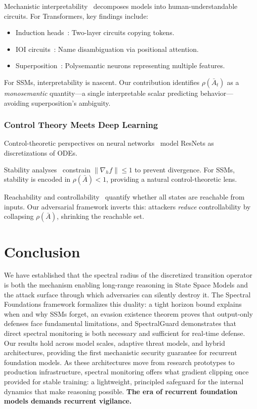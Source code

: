 \documentclass[10pt,twocolumn]{article}
\begin{document}
Mechanistic interpretability~\cite{elhage2021mathematical,olah2020zoom} decomposes models into human-understandable circuits. For Transformers, key findings include:
\begin{itemize}
\item Induction heads~\cite{olsson2022context}: Two-layer circuits copying tokens.
\item IOI circuits~\cite{wang2022interpretability}: Name disambiguation via positional attention.
\item Superposition~\cite{elhage2022toy}: Polysemantic neurons representing multiple features.
\end{itemize}

For SSMs, interpretability is nascent. Our contribution identifies $\rho(\bar{A}_t)$ as a \emph{monosemantic} quantity---a single interpretable scalar predicting behavior---avoiding superposition's ambiguity.

\subsubsection{Control Theory Meets Deep Learning}

Control-theoretic perspectives on neural networks~\cite{haber2017stable,ruthotto2020deep} model ResNets as discretizations of ODEs.

Stability analyses~\cite{li2018stabilizing,orvieto2023resurrecting} constrain $\|\nabla_h f\| \le 1$ to prevent divergence. For SSMs, stability is encoded in $\rho(\bar{A}) < 1$, providing a natural control-theoretic lens.

Reachability and controllability~\cite{kalman1960contributions} quantify whether all states are reachable from inputs. Our adversarial framework inverts this: attackers \emph{reduce} controllability by collapsing $\rho(\bar{A})$, shrinking the reachable set.

\section{Conclusion}
\label{sec:conclusion}

We have established that the spectral radius of the discretized transition operator is both the mechanism enabling long-range reasoning in State Space Models and the attack surface through which adversaries can silently destroy it. The Spectral Foundations framework formalizes this duality: a tight horizon bound explains when and why SSMs forget, an evasion existence theorem proves that output-only defenses face fundamental limitations, and SpectralGuard demonstrates that direct spectral monitoring is both necessary and sufficient for real-time defense. Our results hold across model scales, adaptive threat models, and hybrid architectures, providing the first mechanistic security guarantee for recurrent foundation models. As these architectures move from research prototypes to production infrastructure, spectral monitoring offers what gradient clipping once provided for stable training: a lightweight, principled safeguard for the internal dynamics that make reasoning possible. \textbf{The era of recurrent foundation models demands recurrent vigilance.}
\end{document}
